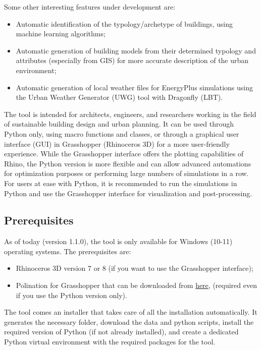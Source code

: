 \documentclass[a4paper,12pt]{article} %
\begin{document}
    Some other interesting features under development are:
    \begin{itemize}
        \item Automatic identification of the typology/archetype of buildings, using machine learning algorithms;
        \item Automatic generation of building models from their determined typology and attributes (especially from GIS) for more accurate description of the urban environment;
        \item Automatic generation of local weather files for EnergyPlus simulations using the Urban Weather Generator (UWG) tool with Dragonfly (LBT).
    \end{itemize}
    \smallbreak
    The tool is intended for architects, engineers, and researchers working in the field of sustainable building design and urban planning.
    It can be used through Python only, using macro functions and classes, or through a graphical user interface (GUI) in Grasshopper (Rhinoceros 3D) for a more user-friendly experience.
    While the Grasshopper interface offers the plotting capabilities of Rhino, the Python version is more flexible and can allow advanced automations for optimization purposes or performing large numbers of simulations in a row.
    For users at ease with Python, it is recommended to run the simulations in Python and use the Grasshopper interface for visualization and post-processing.

    \subsection{Prerequisites}
    As of today (version 1.1.0), the tool is only available for Windows (10-11) operating systems.
    The prerequisites are:
    \begin{itemize}
        \item Rhinoceros 3D version 7 or 8 (if you want to use the Grasshopper interface);
        \item Polination for Grasshopper that can be downloaded from \href{https://www.pollination.cloud/grasshopper-plugin}{here}, (required even if you use the Python version only).
    \end{itemize}
    The tool comes an installer that takes care of all the installation automatically.
    It generates the necessary folder, download the data and python scripts, install the required version of Python (if not already installed), and create a dedicated Python virtual environment with the required packages for the tool.
\end{document}
